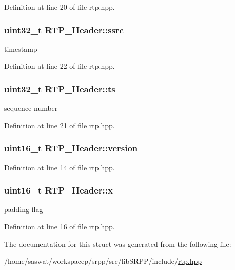 Definition at line 20 of file rtp.hpp.

\hypertarget{struct_r_t_p___header_a895a7627b17b1d241539f94c806a901d}{
\subsubsection[{ssrc}]{\setlength{\rightskip}{0pt plus 5cm}uint32\_\-t {\bf RTP\_\-Header::ssrc}}}
\label{struct_r_t_p___header_a895a7627b17b1d241539f94c806a901d}
timestamp 

Definition at line 22 of file rtp.hpp.

\hypertarget{struct_r_t_p___header_afa91b2845c6256f0a389eb0e186bf398}{
\subsubsection[{ts}]{\setlength{\rightskip}{0pt plus 5cm}uint32\_\-t {\bf RTP\_\-Header::ts}}}
\label{struct_r_t_p___header_afa91b2845c6256f0a389eb0e186bf398}
sequence number 

Definition at line 21 of file rtp.hpp.

\hypertarget{struct_r_t_p___header_a0168330394469ead3fc335170f3af3a3}{
\subsubsection[{version}]{\setlength{\rightskip}{0pt plus 5cm}uint16\_\-t {\bf RTP\_\-Header::version}}}
\label{struct_r_t_p___header_a0168330394469ead3fc335170f3af3a3}


Definition at line 14 of file rtp.hpp.

\hypertarget{struct_r_t_p___header_a1d0f8d9f53925ca9e420d9c4b78d1e31}{
\subsubsection[{x}]{\setlength{\rightskip}{0pt plus 5cm}uint16\_\-t {\bf RTP\_\-Header::x}}}
\label{struct_r_t_p___header_a1d0f8d9f53925ca9e420d9c4b78d1e31}
padding flag 

Definition at line 16 of file rtp.hpp.



The documentation for this struct was generated from the following file:\begin{DoxyCompactItemize}
\item 
/home/saswat/workspacep/srpp/src/libSRPP/include/\hyperlink{rtp_8hpp}{rtp.hpp}\end{DoxyCompactItemize}
